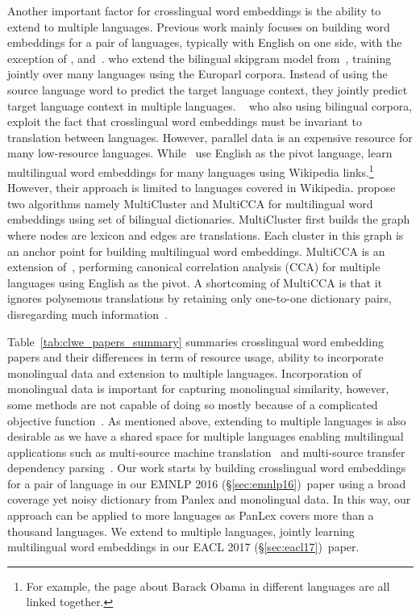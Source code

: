 \documentclass[12pt,twoside,final,hidelinks]{ltthesis}
\theoremstyle{definition}
\newcommand\emnlpvi{EMNLP 2016 (\S\ref{sec:emnlp16})}
\newcommand\eaclvii{EACL 2017 (\S\ref{sec:eacl17})}
\begin{document}
Another important factor for crosslingual word embeddings is the ability to extend to multiple languages. 
Previous work mainly focuses on building word embeddings for a pair of languages, typically 
with English on one side, with the exception of ,  and~. 
 who extend the bilingual skipgram model from~, training jointly over many languages using the Europarl corpora. Instead of using the source language word to predict the target language context, they jointly predict target language context in multiple languages. 
~ who also using bilingual corpora, exploit the fact that crosslingual word embeddings must be invariant to translation between languages. However, parallel data is an expensive resource  for many low-resource languages. 
While~ use English as the pivot language, 
learn multilingual word embeddings for many languages using Wikipedia links.\footnote{For example, the page about Barack Obama in different languages are all linked together.}
However, their approach is limited to languages covered in Wikipedia.
 propose two algorithms namely MultiCluster and MultiCCA 
for multilingual word embeddings using set of bilingual dictionaries. MultiCluster first 
builds the graph where nodes are lexicon and edges are translations. Each cluster in this 
graph is an anchor point for building multilingual word embeddings. MultiCCA is an extension 
of~, performing canonical correlation analysis (CCA) for 
multiple languages using English as the pivot. A shortcoming of MultiCCA is that 
it ignores polysemous translations by retaining only one-to-one dictionary 
pairs, disregarding much information~\cite{icml2015_gouws15}. 

Table~\ref{tab:clwe_papers_summary}
summaries crosslingual word embedding papers and their differences in term of resource usage,
ability to incorporate monolingual data and extension to multiple languages. Incorporation of monolingual data is 
important for capturing monolingual similarity, however, some methods are not capable of doing so 
mostly because of a complicated objective function~\cite{Luong-etal:naacl15:bivec}. As mentioned above, extending to multiple languages is 
also desirable as we have a shared space for multiple languages enabling multilingual 
applications such as multi-source machine translation~\cite{zoph-knight:2016:N16-1} and 
multi-source transfer dependency parsing~\cite{McDonald:2011:MTD}. Our work starts by building crosslingual word embeddings 
for a pair of language in our \emnlpvi\ paper using a broad coverage yet noisy dictionary from Panlex and  monolingual data.
In this way, our approach can be applied to more languages as PanLex covers more than a thousand languages. 
We extend to multiple languages, jointly learning multilingual word embeddings in our \eaclvii\ paper.
\end{document}

